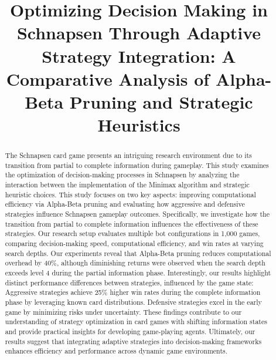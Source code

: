 \documentclass[runningheads]{llncs}
\begin{document}
%
\title{Optimizing Decision Making in Schnapsen Through
Adaptive Strategy Integration:
A Comparative Analysis of Alpha-Beta Pruning and Strategic Heuristics}
\author{}
\institute{}
%

\maketitle
%
\begin{abstract}
The Schnapsen card game presents an intriguing research environment \cite{ref_schnapsen1} due to its transition from partial to complete information during gameplay. This study examines the optimization of decision-making processes in Schnapsen by analyzing the interaction between the implementation of the Minimax algorithm and strategic heuristic choices.
This study focuses on two key aspects: improving computational efficiency via Alpha-Beta pruning and evaluating how aggressive and defensive strategies influence Schnapsen gameplay outcomes. Specifically, we investigate how the transition from partial to complete information influences the effectiveness of these strategies. Our research setup evaluates multiple bot configurations in 1,000 games, comparing decision-making speed, computational efficiency, and win rates at varying search depths.
Our experiments reveal that Alpha-Beta pruning reduces computational overhead by 40\%, although diminishing returns were observed when the search depth exceeds level 4 during the partial information phase. Interestingly, our results highlight distinct performance differences between strategies, influenced by the game state: Aggressive strategies achieve 25\% higher win rates during the complete information phase by leveraging known card distributions. Defensive strategies excel in the early game by minimizing risks under uncertainty. These findings contribute to our understanding of strategy optimization in card games with shifting information states and provide practical insights for developing game-playing agents. Ultimately, our results suggest that integrating adaptive strategies into decision-making frameworks enhances efficiency and performance across dynamic game environments. 

\end{abstract}
\end{document}
